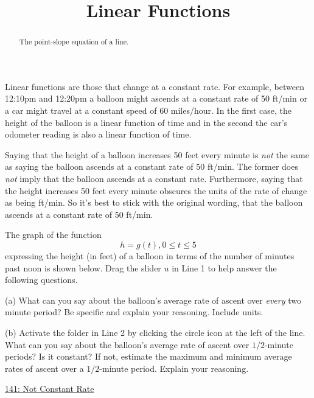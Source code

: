 \documentclass{ximera}
\title{Linear Functions}
\begin{document}
\begin{abstract}
The point-slope equation of a line.
\end{abstract}
\maketitle

Linear functions are those that change at a constant rate. For example, between 12:10pm and 12:20pm a balloon might ascends at a constant rate of 50 ft/min or a car might travel at a constant speed of 60 miles/hour. In the first case, the height of the balloon is a linear function of time and in the second the car's odometer reading is also a linear function of time.

Saying that the height of a balloon increases 50 feet every minute is \emph{not} the same as saying the balloon ascends at a constant rate of $50$ ft/min. The former does \emph{not} imply that the balloon ascends at a constant rate. Furthermore, saying that the height increases 50 feet every minute obscures the units of the rate of change as being ft/min. So it's best to stick with the original wording, that the balloon ascends at a constant rate of 50 ft/min.


\begin{question}  \label{Q343rfgg}
The graph of the function
\[
    h = g(t) , 0\leq t \leq 5
\]
expressing the height (in feet) of a balloon in terms of the number of minutes past noon is shown below. Drag the slider $u$ in Line 1 to help answer the following questions.

\begin{freeResponse}
(a) What can you say about the balloon's average rate of ascent over \emph{every} two minute period? Be specific and explain your reasoning. Include units.

(b) Activate the folder in Line 2 by clicking the circle icon at the left of the line. What can you say about the balloon's average rate of ascent over $1/2$-minute periods? Is it constant? If not, estimate the maximum and minimum average rates of ascent over a $1/2$-minute period. Explain your reasoning.
\end{freeResponse}

 
\begin{onlineOnly}
    \begin{center}
\end{center}
\end{onlineOnly}

\href{https://www.desmos.com/calculator/uiv2z0pgxx}{141: Not Constant Rate}

\end{question}
\end{document}
